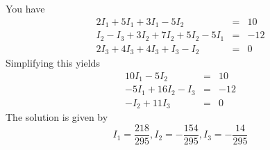 \begin{enumialphparenastyle}
\begin{ex}
  \begin{sol}
    You
    have
    \begin{eqnarray*}
      2I_{1}+5I_{1}+3I_{1}-5I_{2} &=& 10 \\
      I_{2}- I_{3} +3I_{2}+7I_{2}+5I_{2}-5I_{1}  &=&-12 \\
      2I_{3}+4I_{3}+4I_{3}+I_{3}-I_{2} &=& 0
    \end{eqnarray*}
    Simplifying this yields
    \begin{eqnarray*}
      10I_{1}-5I_{2} &=& 10 \\
      -5I_{1} + 16I_{2}- I_{3} &=&-12 \\
      -I_{2} + 11I_{3} &=&0
    \end{eqnarray*}
    The solution is given by 
    \begin{equation*}
      I_{1}=\frac{218}{295},I_{2}=-\frac{154}{295},I_{3}=-\frac{14}{295}
    \end{equation*}
    
  \end{sol}
\end{ex}

\end{enumialphparenastyle}
